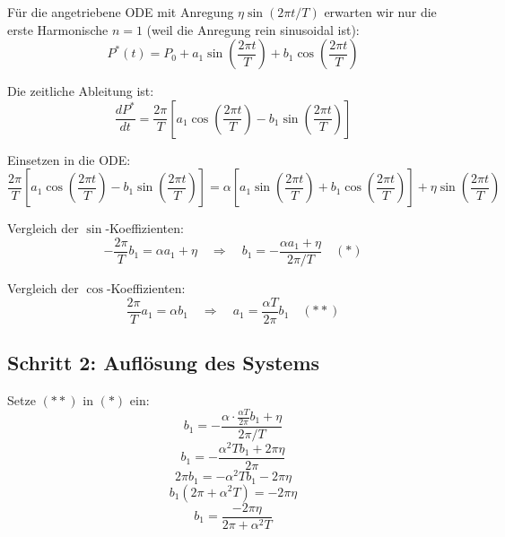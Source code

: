 \documentclass[a4paper,11pt]{report}
\theoremstyle{definition}
\begin{document}
Für die angetriebene ODE mit Anregung $\eta \sin(2\pi t / T)$ erwarten wir nur die erste Harmonische $n=1$ (weil die Anregung rein sinusoidal ist):
\begin{equation}
    P^*(t) = P_0 + a_1 \sin\left(\frac{2\pi t}{T}\right) + b_1 \cos\left(\frac{2\pi t}{T}\right)
\end{equation}

Die zeitliche Ableitung ist:
\begin{equation}
    \frac{dP^*}{dt} = \frac{2\pi}{T}\left[a_1 \cos\left(\frac{2\pi t}{T}\right) - b_1 \sin\left(\frac{2\pi t}{T}\right)\right]
\end{equation}

Einsetzen in die ODE:
\begin{equation}
    \frac{2\pi}{T}\left[a_1 \cos\left(\frac{2\pi t}{T}\right) - b_1 \sin\left(\frac{2\pi t}{T}\right)\right] = \alpha\left[a_1 \sin\left(\frac{2\pi t}{T}\right) + b_1 \cos\left(\frac{2\pi t}{T}\right)\right] + \eta \sin\left(\frac{2\pi t}{T}\right)
\end{equation}

Vergleich der $\sin$-Koeffizienten:
\begin{equation}
    -\frac{2\pi}{T} b_1 = \alpha a_1 + \eta \quad \Rightarrow \quad b_1 = -\frac{\alpha a_1 + \eta}{2\pi/T} \quad (*)
\end{equation}

Vergleich der $\cos$-Koeffizienten:
\begin{equation}
    \frac{2\pi}{T} a_1 = \alpha b_1 \quad \Rightarrow \quad a_1 = \frac{\alpha T}{2\pi} b_1 \quad (**)
\end{equation}

\subsection{Schritt 2: Auflösung des Systems}

Setze $(**)$ in $(*)$ ein:
\begin{equation}
    b_1 = -\frac{\alpha \cdot \frac{\alpha T}{2\pi} b_1 + \eta}{2\pi/T}
\end{equation}
\begin{equation}
    b_1 = -\frac{\alpha^2 T b_1 + 2\pi \eta}{2\pi}
\end{equation}
\begin{equation}
    2\pi b_1 = -\alpha^2 T b_1 - 2\pi \eta
\end{equation}
\begin{equation}
    b_1(2\pi + \alpha^2 T) = -2\pi \eta
\end{equation}
\begin{equation}
    b_1 = \frac{-2\pi \eta}{2\pi + \alpha^2 T}
\end{equation}
\end{document}
